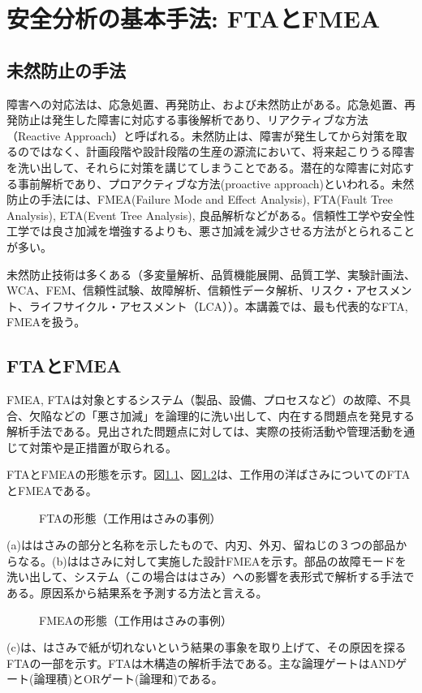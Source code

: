 \chapter{安全分析の基本手法: FTAとFMEA}
\label{chap2}
\section{未然防止の手法}
障害への対応法は、応急処置、再発防止、および未然防止がある。応急処置、再発防止は発生した障害に対応する事後解析であり、リアクティブな方法（Reactive Approach）と呼ばれる。未然防止は、障害が発生してから対策を取るのではなく、計画段階や設計段階の生産の源流において、将来起こりうる障害を洗い出して、それらに対策を講じてしまうことである。潜在的な障害に対応する事前解析であり、プロアクティブな方法(proactive approach)といわれる。未然防止の手法には、FMEA(Failure Mode and Effect Analysis), FTA(Fault Tree Analysis), ETA(Event Tree Analysis), 良品解析などがある。信頼性工学や安全性工学では良さ加減を増強するよりも、悪さ加減を減少させる方法がとられることが多い。

未然防止技術は多くある（多変量解析、品質機能展開、品質工学、実験計画法、WCA、FEM、信頼性試験、故障解析、信頼性データ解析、リスク・アセスメント、ライフサイクル・アセスメント（LCA））。本講義では、最も代表的なFTA, FMEAを扱う。
\section{FTAとFMEA}
 FMEA, FTAは対象とするシステム（製品、設備、プロセスなど）の故障、不具合、欠陥などの「悪さ加減」を論理的に洗い出して、内在する問題点を発見する解析手法である。見出された問題点に対しては、実際の技術活動や管理活動を通じて対策や是正措置が取られる。
 
FTAとFMEAの形態を示す。図\ref{191}、図\ref{192}は、工作用の洋ばさみについてのFTAとFMEAである。
\begin{figure}[htbp]
\begin{center}
\end{center}
\caption{FTAの形態（工作用はさみの事例）}
\label{191}
\end{figure}
(a)ははさみの部分と名称を示したもので、内刃、外刃、留ねじの３つの部品からなる。(b)ははさみに対して実施した設計FMEAを示す。部品の故障モードを洗い出して、システム（この場合ははさみ）への影響を表形式で解析する手法である。原因系から結果系を予測する方法と言える。
\begin{figure}[htbp]
\begin{center}
\end{center}
\caption{FMEAの形態（工作用はさみの事例）}
\label{192}
\end{figure}
(c)は、はさみで紙が切れないという結果の事象を取り上げて、その原因を探るFTAの一部を示す。FTAは木構造の解析手法である。主な論理ゲートはANDゲート(論理積)とORゲート(論理和)である。

